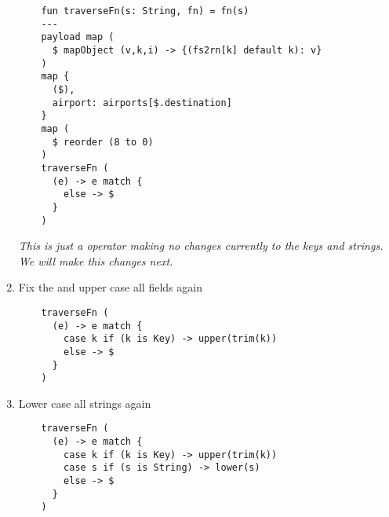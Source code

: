 \begin{enumerate}[resume*]
\begin{lstlisting}
    fun traverseFn(s: String, fn) = fn(s)
    ---
    payload map (
      $ mapObject (v,k,i) -> {(fs2rn[k] default k): v}
    )
    map {
      ($),
      airport: airports[$.destination]
    }
    map (
      $ reorder (8 to 0)
    )
    traverseFn (
      (e) -> e match {
        else -> $
      }
    )
  \end{lstlisting}
  \emph{
    This \les{} is just a  operator making no changes currently to the keys and strings.  We will make this changes next.
  }
\item Fix the  and upper case all fields again
  \begin{lstlisting}
    traverseFn (
      (e) -> e match {
        case k if (k is Key) -> upper(trim(k))
        else -> $
      }
    )
  \end{lstlisting}
\item Lower case all strings again
  \begin{lstlisting}
    traverseFn (
      (e) -> e match {
        case k if (k is Key) -> upper(trim(k))
        case s if (s is String) -> lower(s)
        else -> $
      }
    )    
  \end{lstlisting}
\end{enumerate}

